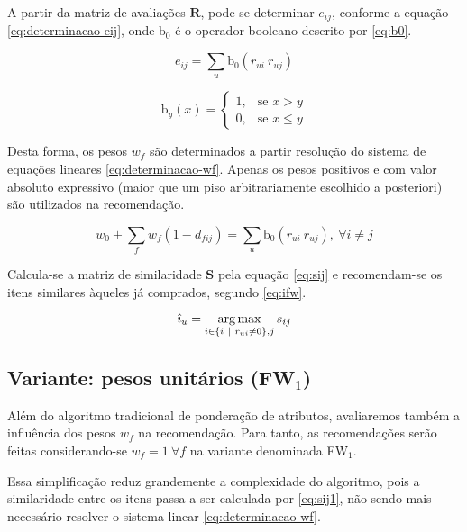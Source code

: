 A partir da matriz de avaliações $\mathbf{R}$, pode-se determinar $e_{ij}$, conforme a equação \ref{eq:determinacao-eij}, onde $\mathrm{b_0}$ é o operador booleano descrito por \ref{eq:b0}.

\begin{equation}
\label{eq:determinacao-eij} 
    e_{ij} = \sum_{u}{\mathrm{b_0}\left(r_{ui} ~ r_{uj}\right)}
\end{equation} 

\begin{equation}
\label{eq:b0}
\mathrm{b}_y\left(x\right) = 
\begin{cases}
1, &\text{se }x>y \\
0, &\text{se }x\leq y
\end{cases} 
\end{equation}

Desta forma, os pesos $w_f$ são determinados a partir resolução do sistema de equações lineares \ref{eq:determinacao-wf}. Apenas os pesos positivos e com valor absoluto expressivo (maior que um piso arbitrariamente escolhido a posteriori) são utilizados na recomendação. 

\begin{equation}
\label{eq:determinacao-wf} 
    w_0 + \sum_{f}{w_{f}  \left(1-d_{fij}\right)} = \sum_{u}{\mathrm{b_0}\left(r_{ui} ~ r_{uj}\right)},~\forall i \neq j 
\end{equation} 

Calcula-se a matriz de similaridade $\mathbf{S}$ pela equação \ref{eq:sij} e recomendam-se os itens similares àqueles já comprados, segundo \ref{eq:ifw}.

\begin{equation}
\label{eq:ifw} 
    \hat{\imath}_u = \operatorname*{arg\,max}_{i \in \left\{i~|~r_{ui} \neq 0\right\}, j}{s_{ij}}
\end{equation} 

\subsection{Variante: pesos unitários (FW$_1$)} %
\label{sub:variante_pesos_unit_rios}

Além do algoritmo tradicional de ponderação de atributos, avaliaremos também a influência dos pesos $w_f$ na recomendação. Para tanto, as recomendações serão feitas considerando-se $w_f = 1~\forall f$ na variante denominada FW$_1$. 

Essa simplificação reduz grandemente a complexidade do algoritmo, pois a similaridade entre os itens passa a ser calculada por \ref{eq:sij1}, não sendo mais necessário  resolver o sistema linear \ref{eq:determinacao-wf}. 


